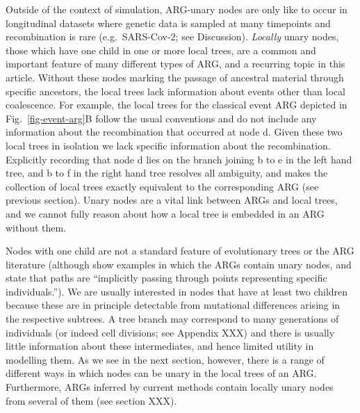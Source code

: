 \documentclass{article}
\newcommand{\noderef}[1]{\textsf{#1}}
\begin{document}
Outside of the context of simulation, ARG-unary nodes are
only like to occur in longitudinal datasets where genetic
data is sampled at many timepoints and recombination
is rare (e.g.~SARS-Cov-2; see Discussion).
\emph{Locally} unary nodes, those which have one child
in one or more local trees, are a common and important feature
of many different types of ARG, and a recurring topic
in this article. Without these nodes marking the passage
of ancestral material through specific ancestors, the local trees
lack information about events other than local coalescence.
For example, the local trees for the classical event ARG
depicted in Fig.~\ref{fig-event-arg}B follow the usual conventions
and do not include any information about the recombination
that occurred at node \noderef{d}. Given these two local trees
in isolation
we lack specific information about the recombination.
Explicitly recording that node \noderef{d} lies on the
branch joining \noderef{b} to \noderef{e} in the left hand
tree, and \noderef{b} to \noderef{f} in the right hand tree
resolves all ambiguity, and makes the collection of local
trees exactly equivalent to the corresponding ARG (see previous section).
Unary nodes are a vital link between ARGs and local trees, and we
cannot fully reason about how a local tree is embedded in an ARG
without them.

Nodes with one child are not a standard feature of evolutionary trees
or the ARG literature
(although \citet{mathieson2020ancestry} show examples in which the ARGs
contain unary nodes, and state that paths are
``implicitly passing through points representing specific individuals.'').
We are usually interested in
nodes that have at least two children because these
are in principle detectable from mutational differences
arising in the respective subtrees.
A tree branch may correspond to many generations
of individuals (or indeed cell divisions; see Appendix XXX)
and there is usually
little information about these intermediates, and hence limited utility
in modelling them.
As we see in the next section, however, there is a range of
different ways in which nodes can be unary in the local trees
of an ARG. Furthermore, ARGs inferred by current methods contain
locally unary nodes from several of them (see section XXX).
\end{document}
